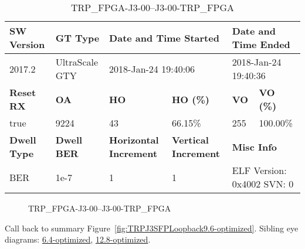 \begin{table}[h]
\centering
\caption{TRP\_FPGA-J3-00--J3-00-TRP\_FPGA}
\label{tab:TRPFPGAJ300J300TRPFPGA9.6-optimized}
\begin{tabular}{@{}|l|l|l|l|l|l|@{}}
\toprule
\textbf{SW Version}                & \textbf{GT Type}   & \multicolumn{2}{l|}{\textbf{Date and Time Started}}            & \multicolumn{2}{l|}{\textbf{Date and Time Ended}}        \\ \midrule
2017.2                       & UltraScale GTY          & \multicolumn{2}{l|}{2018-Jan-24 19:40:06}                   & \multicolumn{2}{l|}{2018-Jan-24 19:40:36}               \\ \midrule
\textbf{Reset RX}                  & \textbf{OA} & \textbf{HO}   & \textbf{HO (\%)} & \textbf{VO} & \textbf{VO (\%)} \\ \midrule
true & 9224        & 43          & 66.15\%        & 255        & 100.00\%       \\ \midrule
\textbf{Dwell Type}                & \textbf{Dwell BER} & \textbf{Horizontal Increment} & \textbf{Vertical Increment}    & \multicolumn{2}{l|}{\textbf{Misc Info}}                  \\ \midrule
BER                            & 1e-7        & 1        & 1           & \multicolumn{2}{l|}{ELF Version: 0x4002 SVN: 0}                         \\ \bottomrule
\end{tabular}
\end{table}

\begin{figure}[h]
\caption{TRP\_FPGA-J3-00--J3-00-TRP\_FPGA} \label{fig:TRPFPGAJ300J300TRPFPGA9.6-optimized}
\end{figure}

Call back to summary Figure~\ref{fig:TRPJ3SFPLoopback9.6-optimized}.
Sibling eye diagrams: \hyperref[sec:TRPFPGAJ300J300TRPFPGA6.4-optimized]{6.4-optimized}, \hyperref[sec:TRPFPGAJ300J300TRPFPGA12.8-optimized]{12.8-optimized}.

\clearpage
\newpage

